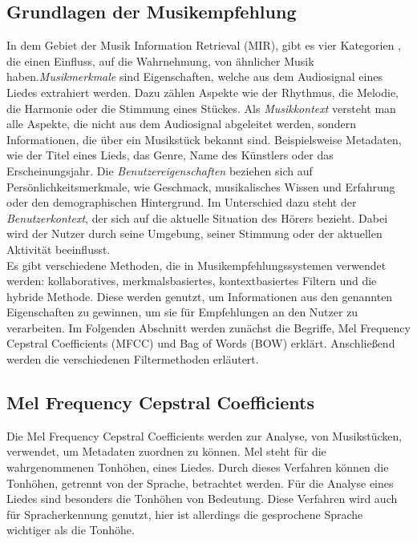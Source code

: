 \documentclass[twosided,a4,10pt]{article}
\begin{document}
\begin{multicols}{2}
		\section{Grundlagen der Musikempfehlung}
		In dem Gebiet der Musik Information Retrieval (MIR), gibt es vier Kategorien \cite{schedl}, die einen Einfluss, auf die Wahrnehmung, von ähnlicher Musik haben.\newline \textit{Musikmerkmale} sind Eigenschaften, welche aus dem Audiosignal eines Liedes extrahiert werden. Dazu zählen Aspekte wie der Rhythmus, die Melodie, die Harmonie oder die Stimmung eines Stückes.\newline
		Als \textit{Musikkontext} versteht man alle Aspekte, die nicht aus dem Audiosignal abgeleitet werden, sondern Informationen, die über ein Musikstück bekannt sind. Beispielsweise Metadaten, wie der Titel eines Lieds, das Genre, Name des Künstlers oder das Erscheinungsjahr.\newline
		Die \textit{Benutzereigenschaften} beziehen sich auf Persönlichkeitsmerkmale, wie Geschmack, musikalisches Wissen und Erfahrung oder den demographischen Hintergrund.\newline
		Im Unterschied dazu steht der \textit{Benutzerkontext}, der sich auf die aktuelle Situation des Hörers bezieht. Dabei wird der Nutzer durch seine Umgebung, seiner Stimmung oder der aktuellen Aktivität beeinflusst. \cite{knees}\newline\\
		Es gibt verschiedene Methoden, die in Musikempfehlungssystemen verwendet werden: kollaboratives, merkmalsbasiertes, kontextbasiertes Filtern und die hybride Methode. Diese werden genutzt, um Informationen aus den genannten Eigenschaften zu gewinnen, um sie für Empfehlungen an den Nutzer zu verarbeiten. \cite{wang}\newline
		Im Folgenden Abschnitt werden zunächst die Begriffe, Mel Frequency Cepstral Coefficients (MFCC) und Bag of Words (BOW) erklärt. Anschließend werden die verschiedenen Filtermethoden erläutert.
		\subsection{Mel Frequency Cepstral Coefficients}
		Die Mel Frequency Cepstral Coefficients werden zur Analyse, von Musikstücken, verwendet, um Metadaten zuordnen zu können. Mel steht für die wahrgenommenen Tonhöhen, eines Liedes. Durch dieses Verfahren können die Tonhöhen, getrennt von der Sprache, betrachtet werden. Für die Analyse eines Liedes sind besonders die Tonhöhen von Bedeutung. Diese Verfahren wird auch für Spracherkennung genutzt, hier ist allerdings die gesprochene Sprache wichtiger als die Tonhöhe. \cite{MFCC}

\end{multicols}
\end{document}
